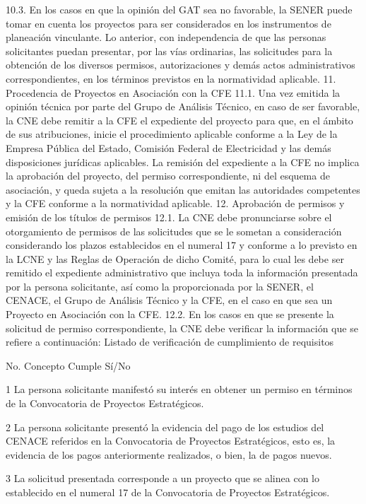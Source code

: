 10.3. En los casos en que la opinión del GAT sea no favorable, la SENER puede tomar en cuenta los proyectos para ser considerados en los instrumentos de planeación vinculante. Lo anterior, con independencia de que las personas solicitantes puedan presentar, por las vías ordinarias, las solicitudes para la obtención de los diversos permisos, autorizaciones y demás actos administrativos correspondientes, en los términos previstos en la normatividad aplicable.
11. Procedencia de Proyectos en Asociación con la CFE
11.1. Una vez emitida la opinión técnica por parte del Grupo de Análisis Técnico, en caso de ser favorable, la CNE debe remitir a la CFE el expediente del proyecto para que, en el ámbito de sus atribuciones, inicie el procedimiento aplicable conforme a la Ley de la Empresa Pública del Estado, Comisión Federal de Electricidad y las demás disposiciones jurídicas aplicables.
La remisión del expediente a la CFE no implica la aprobación del proyecto, del permiso correspondiente, ni del esquema de asociación, y queda sujeta a la resolución que emitan las autoridades competentes y la CFE conforme a la normatividad aplicable.
12. Aprobación de permisos y emisión de los títulos de permisos
12.1. La CNE debe pronunciarse sobre el otorgamiento de permisos de las solicitudes que se le sometan a consideración considerando los plazos establecidos en el numeral 17 y conforme a lo previsto en la LCNE y las Reglas de Operación de dicho Comité, para lo cual les debe ser remitido el expediente administrativo que incluya toda la información presentada por la persona solicitante, así como la proporcionada por la SENER, el CENACE, el Grupo de Análisis Técnico y la CFE, en el caso en que sea un Proyecto en Asociación con la CFE.
12.2. En los casos en que se presente la solicitud de permiso correspondiente, la CNE debe verificar la información que se refiere a continuación:
Listado de verificación de cumplimiento de requisitos
 
 No.
 Concepto
 Cumple Sí/No
 
 1
 La persona solicitante manifestó su interés en obtener un permiso en términos de la Convocatoria de Proyectos Estratégicos.
 
 
 2
 La persona solicitante presentó la evidencia del pago de los estudios del CENACE referidos en la Convocatoria de Proyectos Estratégicos, esto es, la evidencia de los pagos anteriormente realizados, o bien, la de pagos nuevos.
 
 
 3
 La solicitud presentada corresponde a un proyecto que se alinea con lo establecido en el numeral 17 de la Convocatoria de Proyectos Estratégicos.
 
